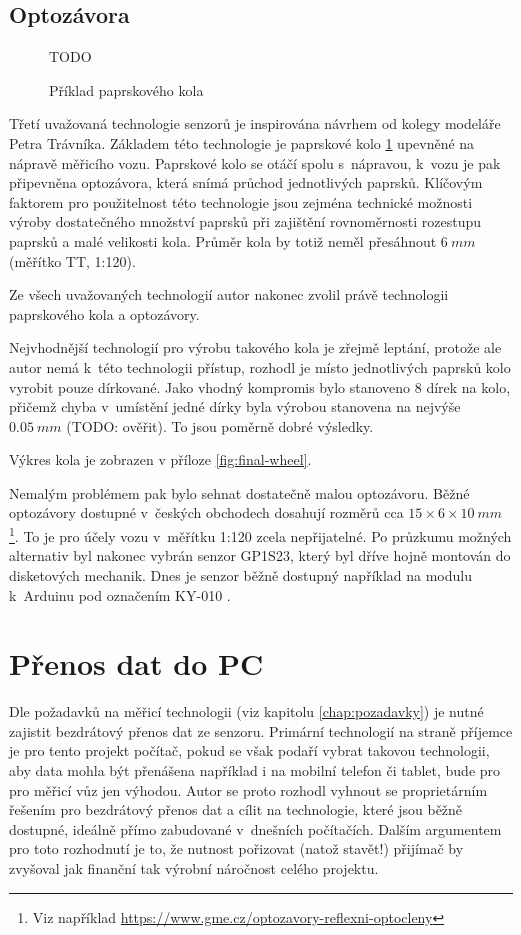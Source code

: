 \subsection{Optozávora}
\label{subsec:wsm-senzor-optozavora}

\begin{figure}[h]
TODO
\caption{Příklad paprskového kola}
\label{fig:wheel}
\end{figure}

Třetí uvažovaná technologie senzorů je inspirována návrhem od kolegy modeláře
Petra Trávníka. Základem této technologie je paprskové kolo \ref{fig:wheel}
upevněné na nápravě měřicího vozu. Paprskové kolo se otáčí spolu s~nápravou,
k~vozu je pak připevněna optozávora, která snímá průchod jednotlivých paprsků.
Klíčovým faktorem pro použitelnost této technologie jsou zejména technické
možnosti výroby dostatečného množství paprsků při zajištění rovnoměrnosti
rozestupu paprsků a malé velikosti kola. Průměr kola by totiž neměl přesáhnout
$6\ mm$ (měřítko TT, 1:120).

Ze všech uvažovaných technologií autor nakonec zvolil právě technologii
paprskového kola a optozávory.

Nejvhodnější technologií pro výrobu takového kola je zřejmě leptání, protože
ale autor nemá k~této technologii přístup, rozhodl je místo jednotlivých
paprsků kolo vyrobit pouze dírkované. Jako vhodný kompromis bylo stanoveno
8 dírek na kolo, přičemž chyba v~umístění jedné dírky byla výrobou stanovena na
nejvýše $0.05\ mm$ (TODO: ověřit). To jsou poměrně dobré výsledky.

Výkres kola je zobrazen v příloze \ref{fig:final-wheel}.

Nemalým problémem pak bylo sehnat dostatečně malou optozávoru. Běžné optozávory
dostupné v~českých obchodech dosahují rozměrů cca $15\times6\times10\ mm$
\footnote{Viz například
\url{https://www.gme.cz/optozavory-reflexni-optocleny}}. To je pro účely vozu
v~měřítku 1:120 zcela nepřijatelné. Po
průzkumu možných alternativ byl nakonec vybrán senzor
GP1S23\cite{gp1s23:datasheet}, který byl dříve hojně montován do disketových
mechanik. Dnes je senzor běžně dostupný například na modulu k~Arduinu pod
označením KY-010 \cite{ky-010}.

\section{Přenos dat do PC}
\label{sec:wsm-prenos-pc}

Dle požadavků na měřicí technologii (viz kapitolu \ref{chap:pozadavky}) je
nutné zajistit bezdrátový přenos dat ze senzoru. Primární technologií na straně
příjemce je pro tento projekt počítač, pokud se však podaří vybrat takovou
technologii, aby data mohla být přenášena například i na mobilní telefon či
tablet, bude pro pro měřicí vůz jen výhodou. Autor se proto rozhodl vyhnout se
proprietárním řešením pro bezdrátový přenos dat a cílit na technologie, které
jsou běžně dostupné, ideálně přímo zabudované v~dnešních počítačích. Dalším
argumentem pro toto rozhodnutí je to, že nutnost pořizovat (natož stavět!)
přijímač by zvyšoval jak finanční tak výrobní náročnost celého projektu.

